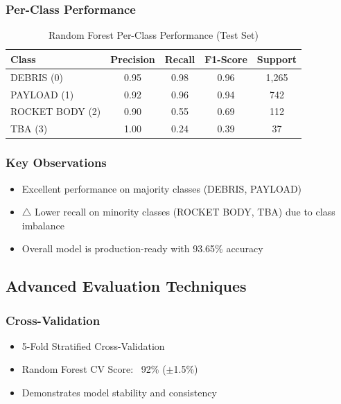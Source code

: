 \documentclass[12pt,a4paper]{article}
\begin{document}
\subsubsection{Per-Class Performance}
\begin{table}[H]
\centering
\begin{tabular}{@{}lcccc@{}}
\toprule
\textbf{Class} & \textbf{Precision} & \textbf{Recall} & \textbf{F1-Score} & \textbf{Support} \\
\midrule
DEBRIS (0) & 0.95 & 0.98 & 0.96 & 1,265 \\
PAYLOAD (1) & 0.92 & 0.96 & 0.94 & 742 \\
ROCKET BODY (2) & 0.90 & 0.55 & 0.69 & 112 \\
TBA (3) & 1.00 & 0.24 & 0.39 & 37 \\
\bottomrule
\end{tabular}
\caption{Random Forest Per-Class Performance (Test Set)}
\label{tab:rf_perclass}
\end{table}

\subsubsection{Key Observations}
\begin{itemize}
    \item \checkmark Excellent performance on majority classes (DEBRIS, PAYLOAD)
    \item \textcolor{accentorange}{$\triangle$} Lower recall on minority classes (ROCKET BODY, TBA) due to class imbalance
    \item \checkmark Overall model is production-ready with 93.65\% accuracy
\end{itemize}

\subsection{Advanced Evaluation Techniques}

\subsubsection{Cross-Validation}
\begin{itemize}
    \item 5-Fold Stratified Cross-Validation
    \item Random Forest CV Score: ~92\% ($\pm$1.5\%)
    \item Demonstrates model stability and consistency
\end{itemize}
\end{document}
